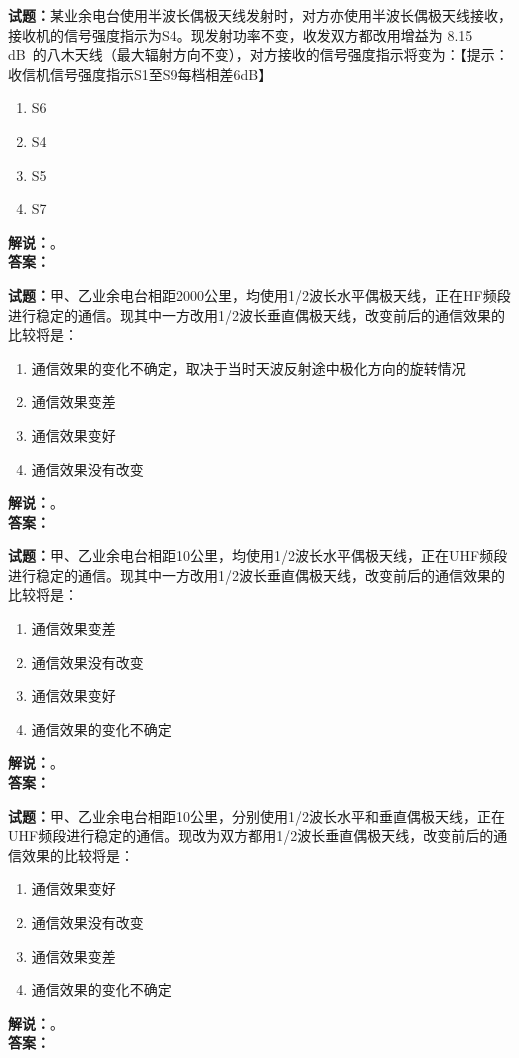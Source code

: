 \documentclass{ctexbook}
\begin{document}
\noindent\textbf{试题：}某业余电台使用半波长偶极天线发射时，对方亦使用半波长偶极天线接收，接收机的信号强度指示为S4。现发射功率不变，收发双方都改用增益为 8.15 \unit[qualifier-mode=combine]{\deci\bel{}}的八木天线（最大辐射方向不变），对方接收的信号强度指示将变为：【提示：收信机信号强度指示S1至S9每档相差6dB】
\begin{enumerate}[leftmargin=3em]
  \item S6
  \item S4
  \item S5
  \item S7
\end{enumerate}
\noindent\textbf{解说：}\textbf{}。\\\noindent\textbf{答案：}

\bigskip

\noindent\textbf{试题：}甲、乙业余电台相距2000公里，均使用1/2波长水平偶极天线，正在HF频段进行稳定的通信。现其中一方改用1/2波长垂直偶极天线，改变前后的通信效果的比较将是：
\begin{enumerate}[leftmargin=3em]
  \item 通信效果的变化不确定，取决于当时天波反射途中极化方向的旋转情况
  \item 通信效果变差
  \item 通信效果变好
  \item 通信效果没有改变
\end{enumerate}
\noindent\textbf{解说：}\textbf{}。\\\noindent\textbf{答案：}

\bigskip

\noindent\textbf{试题：}甲、乙业余电台相距10公里，均使用1/2波长水平偶极天线，正在UHF频段进行稳定的通信。现其中一方改用1/2波长垂直偶极天线，改变前后的通信效果的比较将是：
\begin{enumerate}[leftmargin=3em]
  \item 通信效果变差
  \item 通信效果没有改变
  \item 通信效果变好
  \item 通信效果的变化不确定
\end{enumerate}
\noindent\textbf{解说：}\textbf{}。\\\noindent\textbf{答案：}

\bigskip

\noindent\textbf{试题：}甲、乙业余电台相距10公里，分别使用1/2波长水平和垂直偶极天线，正在UHF频段进行稳定的通信。现改为双方都用1/2波长垂直偶极天线，改变前后的通信效果的比较将是：
\begin{enumerate}[leftmargin=3em]
  \item 通信效果变好
  \item 通信效果没有改变
  \item 通信效果变差
  \item 通信效果的变化不确定
\end{enumerate}
\noindent\textbf{解说：}\textbf{}。\\\noindent\textbf{答案：}
\end{document}
